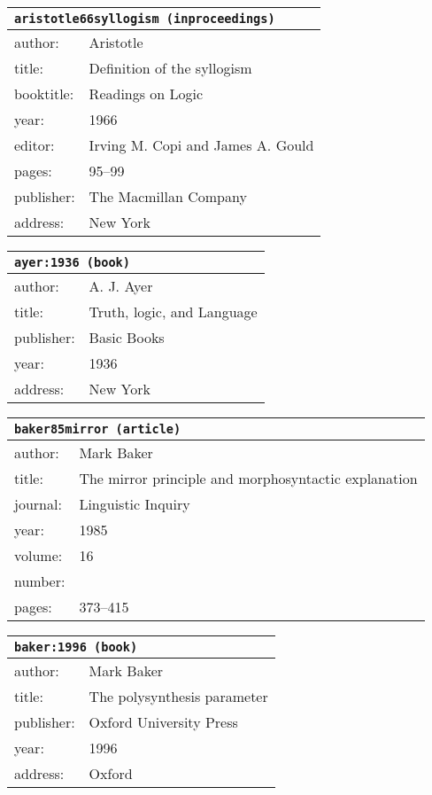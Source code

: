 \documentclass{article}
\begin{document}
\begin{tabular}{p{}p{}}
\multicolumn{2}{l}{\texttt{aristotle66syllogism (inproceedings)}}\\
\hline
author: & Aristotle\\
title: & Definition of the syllogism\\
booktitle: & Readings on Logic\\
year: & 1966\\
editor: & Irving M. Copi and James A. Gould\\
pages: & 95--99\\
publisher: & The Macmillan Company\\
address: & New York\\
\end{tabular}

\bigskip

\begin{tabular}{p{}p{}}
\multicolumn{2}{l}{\texttt{ayer:1936 (book)}}\\
\hline
author: & A. J. Ayer\\
title: & Truth, logic, and Language\\
publisher: & Basic Books\\
year: & 1936\\
address: & New York\\
\end{tabular}

\bigskip

\begin{tabular}{p{}p{}}
\multicolumn{2}{l}{\texttt{baker85mirror (article)}}\\
\hline
author: & Mark Baker\\
title: & The mirror principle and morphosyntactic explanation\\
journal: & Linguistic Inquiry\\
year: & 1985\\
volume: & 16\\
number: & \\
pages: & 373--415\\
\end{tabular}

\bigskip

\begin{tabular}{p{}p{}}
\multicolumn{2}{l}{\texttt{baker:1996 (book)}}\\
\hline
author: & Mark Baker\\
title: & The polysynthesis parameter\\
publisher: & Oxford University Press\\
year: & 1996\\
address: & Oxford\\
\end{tabular}
\end{document}
